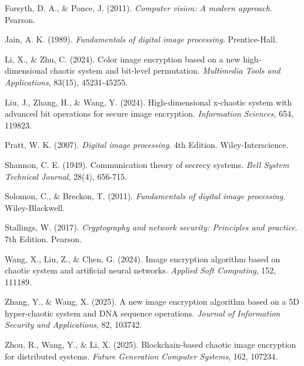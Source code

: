  Forsyth, D. A., \& Ponce, J. (2011). \textit{Computer vision: A modern approach}. Pearson.



 Jain, A. K. (1989). \textit{Fundamentals of digital image processing}. Prentice-Hall.



 Li, X., \& Zhu, C. (2024). Color image encryption based on a new high-dimensional chaotic system and bit-level permutation. \textit{Multimedia Tools and Applications}, 83(15), 45231-45255.



 Liu, J., Zhang, H., \& Wang, Y. (2024). High-dimensional x-chaotic system with advanced bit operations for secure image encryption. \textit{Information Sciences}, 654, 119823.



 Pratt, W. K. (2007). \textit{Digital image processing}. 4th Edition. Wiley-Interscience.



 Shannon, C. E. (1949). Communication theory of secrecy systems. \textit{Bell System Technical Journal}, 28(4), 656-715.



 Solomon, C., \& Breckon, T. (2011). \textit{Fundamentals of digital image processing}. Wiley-Blackwell.



 Stallings, W. (2017). \textit{Cryptography and network security: Principles and practice}. 7th Edition. Pearson.



 Wang, X., Liu, Z., \& Chen, G. (2024). Image encryption algorithm based on chaotic system and artificial neural networks. \textit{Applied Soft Computing}, 152, 111189.



 Zhang, Y., \& Wang, X. (2025). A new image encryption algorithm based on a 5D hyper-chaotic system and DNA sequence operations. \textit{Journal of Information Security and Applications}, 82, 103742.



 Zhou, R., Wang, Y., \& Li, X. (2025). Blockchain-based chaotic image encryption for distributed systems. \textit{Future Generation Computer Systems}, 162, 107234.






